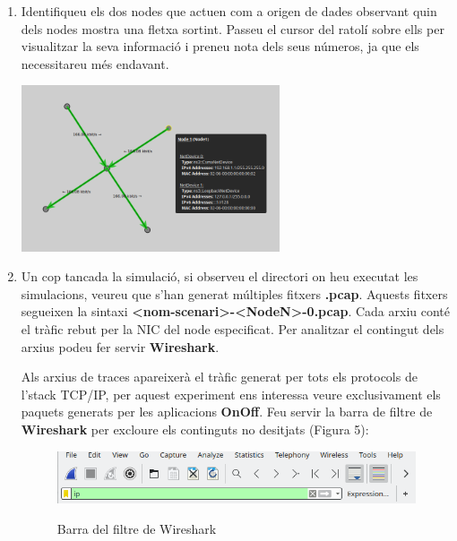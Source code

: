 \documentclass[12pt,a4paper]{article}
\newcounter{exercises}
\newtheorem{exer}[exercises]{Pregunta}
\begin{document}
\begin{enumerate}
\begin{figure}[!ht]
\end{figure}
\item Identifiqueu els dos nodes que actuen com a origen de dades observant quin dels nodes mostra una fletxa sortint. Passeu el cursor del ratolí sobre ells per visualitzar la seva informació i preneu nota dels seus números, ja que els necessitareu més endavant.
\newline \begin{center} \includegraphics[width=0.6\textwidth]{hub-select} \end{center}
\item Un cop tancada la simulació, si observeu el directori on heu executat les simulacions, veureu que s'han generat múltiples fitxers \textbf{.pcap}. Aquests fitxers segueixen la sintaxi \textbf{<nom-scenari>-<NodeN>-0.pcap}. Cada arxiu conté el tràfic rebut per la NIC del node especificat. Per analitzar el contingut dels arxius podeu fer servir \textbf{Wireshark}.

Als arxius de traces apareixerà el tràfic generat per tots els protocols de l'stack TCP/IP, per aquest experiment ens interessa veure exclusivament els paquets generats per les aplicacions \textbf{OnOff}. Feu servir la barra de filtre de \textbf{Wireshark} per excloure els continguts no desitjats (Figura 5):

\begin{figure}[!ht]
  \begin{center}
    \includegraphics[width=1\textwidth]{wireshark-filter}    
    \label{wireshark-filter}
    \caption{Barra del filtre de Wireshark}
  \end{center}
\end{figure}


\end{enumerate}
\end{document}
